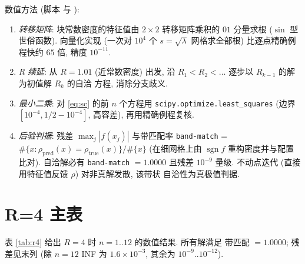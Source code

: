 \documentclass[UTF8]{ctexart}
\begin{document}
数值方法 (脚本  与
):
\begin{enumerate}
	\item \emph{转移矩阵}: 块常数密度的特征值由
		$2\times2$ 转移矩阵乘积的 $01$ 分量求根 ($\sin$ 型世俗函数).
		向量化实现 (一次对 $10^4$ 个 $s = \sqrt\lambda$ 网格求全部根)
		比逐点精确例程快约 $65$ 倍, 精度 $10^{-11}$.
	\item \emph{R 续延}: 从 $R = 1.01$ (近常数密度) 出发, 沿
		$R_1 < R_2 < \dots$ 逐步以 $R_{k-1}$ 的解为初值解 $R_k$ 的自洽
		方程, 消除分支歧义.
	\item \emph{最小二乘}: 对 \eqref{eq:sc} 的前 $n$ 个方程用
		\texttt{scipy.optimize.least\_squares} (边界
		$[10^{-4}, 1/2 - 10^{-4}]$, 高容差), 再用精确例程复核.
	\item \emph{后验判据}: 残差 $\max_j |f(x_j)|$ 与带匹配率
		\texttt{band-match} = $\#\{x: \rho_{\mathrm{pred}}(x) =
		\rho_{\mathrm{true}}(x)\}/\#\{x\}$ (在细网格上由
		$\operatorname{sgn} f$ 重构密度并与配置比对). 自洽解必有
		\texttt{band-match} $= 1.0000$ 且残差 $10^{-9}$ 量级.
		不动点迭代 (直接用特征值反馈 $\rho$) 对非真解发散, 该带状
		自洽性为真极值判据.
\end{enumerate}

\section{R=4 主表}\label{sec:r4}

表 \ref{tab:r4} 给出 $R = 4$ 时 $n = 1..12$ 的数值结果. 所有解满足
带匹配 $= 1.0000$; 残差见末列 (除 $n=12$ INF 为 $1.6\times10^{-3}$,
其余为 $10^{-9}..10^{-12}$).
\end{document}
